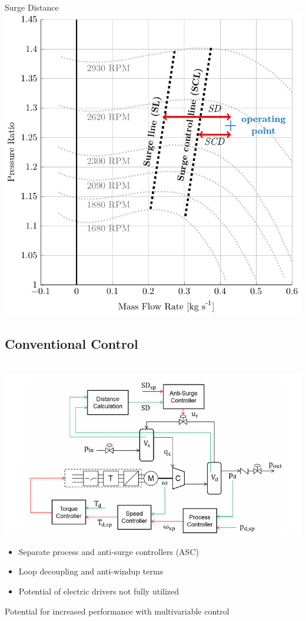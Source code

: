 \begin{frame}{Surge Distance}
    \centering
    \includegraphics[width=.5\linewidth]{figures/surge.pdf}
\end{frame}


\subsection{Conventional Control}
\begin{frame}{~}
  \centering
  \includegraphics[width=0.7\linewidth]{intro/diagram.png}
  \begin{itemize}
    \item Separate process and anti-surge controllers (ASC)
    \item Loop decoupling and anti-windup terms
    \item Potential of electric drivers not fully utilized
  \end{itemize}
  \alert{Potential for increased performance with multivariable control}
\end{frame}

